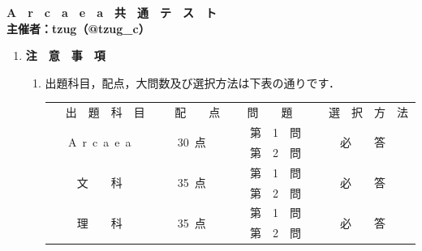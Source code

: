 

\begin{center}
\end{center}
\begin{center}
    {\huge \textbf{A　r　c　a　e　a　共　通　テ　ス　ト}}\\
    \vspace{1em}
    {\Large \textbf{主催者：tzug（@tzug\_c）}}
\end{center}
{\Large
\begin{enumerate}[I]
    \item \textbf{注　意　事　項}
    \begin{enumerate}[1]
        \item 出題科目，配点，大問数及び選択方法は下表の通りです．\\

        \begin{table}[h]
            \centering
            \begin{tabular}{|c|c|c|c|}
                \hline
                \multirow{2}{*}{　出　題　科　目　} & \multirow{2}{*}{　配　　点　} &\multirow{2}{*}{問　　題} & \multirow{2}{*}{　選　択　方　法　} \\
                &&& \\ \hline
                \multirow{2}{*}{A~r~c~a~e~a} &\multirow{2}{*}{30~点} & 　第　1　問　 & \multirow{2}{*}{必　　答}\\  
                    \cline{3-3}
                    &&　第　2　問　& \\
                    \hline
                    \multirow{2}{*}{文　　科} &\multirow{2}{*}{35~点} &　第　1　問　 & \multirow{2}{*}{必　　答}\\
                    \cline{3-3}
                    &&　第　2　問　& \\
                    \hline
                    \multirow{2}{*}{理　　科} &\multirow{2}{*}{35~点} & 　第　1　問　 & \multirow{2}{*}{必　　答}\\
                    \cline{3-3}
                    &&　第　2　問　& \\
                    \hline
            \end{tabular}
        \end{table}


\end{enumerate}
\end{enumerate}}
